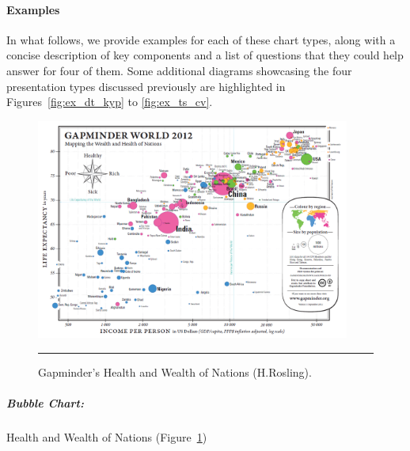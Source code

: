 \paragraph{Examples} In what follows, we provide examples for each of these chart types, along with a concise description of key components and a list of questions that they could help answer for four of them. Some additional diagrams showcasing the four presentation types discussed previously are highlighted in Figures~\ref{fig:ex_dt_kyp} to \ref{fig:ex_ts_cv}.
\begin{figure}[H]
\centering
\includegraphics[width=0.92\textwidth]{images/DV/GapminderMap-2.png}
\caption[\small Bubble Chart: Gapminder's Health and Wealth of Nations ]{\small Gapminder's Health and Wealth of Nations (H.Rosling).} \hrule\label{fig:ex_bc_gap}
\end{figure}
\afterpage{\FloatBarrier}
\subparagraph{Bubble Chart:} Health and Wealth of Nations  (Figure~\ref{fig:ex_bc_gap})
